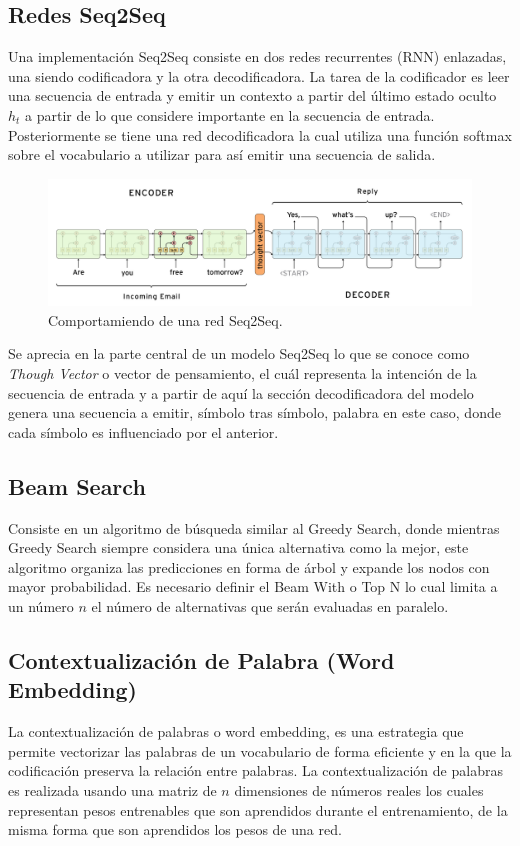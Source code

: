 \documentclass[12pt, letterpaper]{article}
\begin{document}
    \subsection{Redes Seq2Seq}
        Una implementación Seq2Seq consiste en dos redes recurrentes (RNN) enlazadas, una siendo codificadora y la otra decodificadora. La tarea de la codificador es leer una secuencia de entrada y emitir un contexto a partir del último estado oculto $h_t$ a partir de lo que considere importante en la secuencia de entrada. Posteriormente se tiene una red decodificadora la cual utiliza una función softmax sobre el vocabulario a utilizar para así emitir una secuencia de salida\cite{Ramamoorthy}\cite{Ramamoorthy2}.
    
        \begin{figure}[H]
            \centering
            \includegraphics[width=\linewidth]{img/Seq2Seq.png}
            \caption{Comportamiendo de una red Seq2Seq.}
        \end{figure}
    
        Se aprecia en la parte central de un modelo Seq2Seq lo que se conoce como \emph{Though Vector} o vector de pensamiento, el cuál representa la intención de la secuencia de entrada y a partir de aquí la sección decodificadora del modelo genera una secuencia a emitir, símbolo tras símbolo, palabra en este caso, donde cada símbolo es influenciado por el anterior.
    
    \subsection{Beam Search}
    Consiste en un algoritmo de búsqueda similar al Greedy Search, donde mientras Greedy Search siempre considera una única alternativa como la mejor, este algoritmo organiza las predicciones en forma de árbol y expande los nodos con mayor probabilidad.  Es necesario definir el Beam With o Top N lo cual limita a un número $n$ el número de alternativas que serán evaluadas en paralelo\cite{Khandelwal_2020}.
        
    \subsection{Contextualización de Palabra (Word Embedding)}
    La contextualización de palabras o word embedding, es una estrategia que permite vectorizar las palabras de un vocabulario de forma eficiente y en la que la codificación preserva la relación entre palabras. La contextualización de palabras es realizada usando una matriz de $n$ dimensiones de números reales los cuales representan pesos entrenables que son aprendidos durante el entrenamiento, de la misma forma que son aprendidos los pesos de una red. 
    
\end{document}
